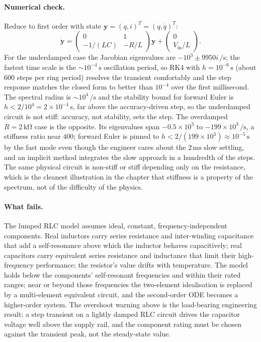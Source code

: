 \paragraph{Numerical check.} Reduce to first order with state
$\mathbf{y} = (q, i)^{T} = (q, \dot{q})^{T}$:
\[
\dot{\mathbf{y}} = \begin{pmatrix} 0 & 1 \\ -1/(LC) & -R/L
\end{pmatrix}\mathbf{y} + \begin{pmatrix} 0 \\ V_{\text{in}}/L
\end{pmatrix}.
\]
For the underdamped case the Jacobian eigenvalues are
$-10^{3} \pm 9950 i\,\si{\per\second}$; the fastest time scale is
the $\sim 10^{-4}\,\si{\second}$ oscillation period, so RK4 with
$h = 10^{-6}\,\si{\second}$ (about $600$ steps per ring period)
resolves the transient comfortably and the step response matches the
closed form to better than $10^{-4}$ over the first millisecond. The
spectral radius is $\sim 10^{4}\,\si{\per\second}$ and the stability
bound for forward Euler is $h < 2/10^{4} = 2\times
10^{-4}\,\si{\second}$, far above the accuracy-driven step, so the
underdamped circuit is not stiff: accuracy, not stability, sets the
step. The overdamped $R = 2\,\si{\kilo\ohm}$ case is the opposite.
Its eigenvalues span $-0.5\times 10^{3}$ to $-199\times 10^{3}\,
\si{\per\second}$, a stiffness ratio near $400$; forward Euler is
pinned to $h < 2/(199\times 10^{3}) \approx 10^{-5}\,\si{\second}$ by
the fast mode even though the engineer cares about the
$2\,\si{\milli\second}$ slow settling, and an implicit method
integrates the slow approach in a hundredth of the steps. The same
physical circuit is non-stiff or stiff depending only on the
resistance, which is the cleanest illustration in the chapter that
stiffness is a property of the spectrum, not of the difficulty of
the physics.

\paragraph{What fails.} The lumped RLC model assumes ideal,
constant, frequency-independent components. Real inductors carry
series resistance and inter-winding capacitance that add a
self-resonance above which the inductor behaves capacitively; real
capacitors carry equivalent series resistance and inductance that
limit their high-frequency performance; the resistor's value drifts
with temperature. The model holds below the components'
self-resonant frequencies and within their rated ranges; near or
beyond those frequencies the two-element idealisation is replaced by
a multi-element equivalent circuit, and the second-order ODE becomes
a higher-order system. The overshoot warning above is the
load-bearing engineering result: a step transient on a lightly
damped RLC circuit drives the capacitor voltage well above the
supply rail, and the component rating must be chosen against the
transient peak, not the steady-state value.


